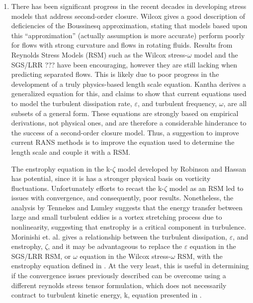 \documentclass[a4paper]{article}
\begin{document}
\begin{enumerate}
  \item There has been significant progress in the recent decades in developing
    stress models that address second-order closure.  Wilcox\cite{wilcox} gives a good
    description of deficiencies of the Boussinesq approximation, stating that
    models based upon this ``approximation'' (actually assumption is more
    accurate) perform poorly for flows with strong curvature and flows in
    rotating fluids.  Results from Reynolds Stress Models (RSM) such as the
    Wilcox stress-$\omega$ model and the SGS/LRR ??? have been encouraging,
    however they are still lacking when predicting separated flows.  This is
    likely due to poor progress in the development of a truly physics-based
    length scale equation.  Kantha\cite{Kantha} derives a generalized equation
    for this, and claims to show that current equations used to model the
    turbulent dissipation rate, $\varepsilon$, and turbulent frequency,
    $\omega$, are all subsets of a general form.  These equations are strongly
    based on empirical derivations, not physical ones, and are therefore a
    considerable hinderance to the success of a second-order closure model.
    Thus, a suggestion to improve current RANS methods is to improve the
    equation used to determine the length scale and couple it with a RSM.
    
    The enstrophy equation in the k-$\zeta$ model developed by Robinson and
    Hassan\cite{Robinson} has potential, since it is has a stronger physical
    basis on vorticity fluctuations.  Unfortunately efforts to recast the
    k-$\zeta$ model as an RSM led to issues with convergence\cite{Xiao}, and
    consequently, poor results.  Nonetheless, the analysis by Tennekes and
    Lumley\cite{lumley} suggests that the energy transfer between large and
    small turbulent eddies is a vortex stretching process due to nonlinearity,
    suggesting that enstrophy is a critical component in turbulence.  Morinishi
    et. al. \cite{morinishi} gives a relationship between the turbulent
    dissipation, $\varepsilon$, and enstrophy, $\zeta$, and it may be
    advantageous to replace the $\varepsilon$ equation in the SGS/LRR RSM, or
    $\omega$ equation in the Wilcox stress-$\omega$ RSM, with the enstrophy
    equation defined in \cite{Xiao}.  At the very least, this is useful in
    determining if the convergence issues previously described can be overcome
    using a different reynolds stress tensor formulation, which does not
    necessarily contract to turbulent kinetic energy, k, equation presented in
    \cite{Robinson}.


\end{enumerate}
\end{document}
